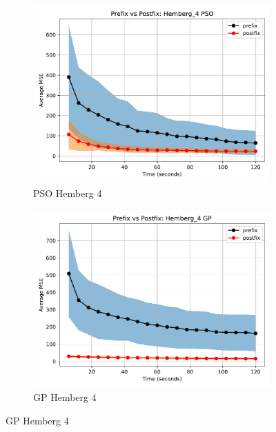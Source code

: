 \documentclass[12pt]{iopart}
\begin{document}
\begin{figure}
    \vspace{0.5cm}
    
    \begin{subfigure}[b]{0.4\textwidth}
        \includegraphics[width=\linewidth, keepaspectratio]{Hemberg_Benchmarks/PrePostHemberg_4PSO.pdf}
        \caption{PSO Hemberg 4}
        \label{subfig:hemberg_4_PSO}
    \end{subfigure}
    \begin{subfigure}[b]{0.4\textwidth}
        \includegraphics[width=\linewidth, keepaspectratio]{Hemberg_Benchmarks/PrePostHemberg_4GP.pdf}
        \caption{GP Hemberg 4}
        \label{subfig:hemberg_4_GP}
    \end{subfigure}
    

\end{figure}
\end{document}
